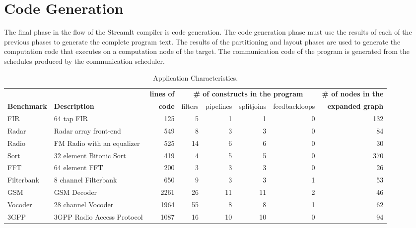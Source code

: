 \section{Code Generation}
\label{sec:codegen}

The final phase in the flow of the StreamIt compiler is code
generation.  The code generation phase must use the results of each of
the previous phases to generate the complete program text.  The
results of the partitioning and layout phases are used to generate the
computation code that executes on a computation node of the target.
The communication code of the program is generated from the schedules
produced by the communication scheduler.

\begin{table*}[t]
\begin{center}
\scriptsize
\begin{tabular}{|l|l||r||r|r|r|r||r|} \hline
 & & {\bf lines of} & \multicolumn{4}{|c||}{\bf \# of constructs in the program} & {\bf \# of nodes in the} \\ \cline{4-7}
{\bf Benchmark} & {\bf Description} & {\bf code} & filters & pipelines & splitjoins & feedbackloops & {\bf expanded graph}
\\
\hline \hline
FIR & 64 tap FIR & 
125 & 5 & 1 & 1 & 0 & 132
\\ \hline
Radar & Radar array front-end\cite{pca} & 
549 & 8 & 3 & 3 & 0 & 84
\\ \hline
Radio & FM Radio with an equalizer & 
525 & 14 & 6 & 6 & 0 & 30
\\ \hline
Sort & 32 element Bitonic Sort & 
419 & 4 & 5 & 5 & 0 & 370
\\  \hline
FFT & 64 element FFT & 
200 & 3 & 3 & 3 & 0 & 26
\\  \hline
Filterbank & 8 channel Filterbank & 
650 & 9 & 3 & 3 & 1 & 53
\\  \hline
GSM & GSM Decoder & 
2261 & 26 & 11 & 11 & 2 & 46
\\ \hline
Vocoder & 28 channel Vocoder &  
1964 & 55 & 8 & 8 & 1 & 62
\\ \hline
3GPP & 3GPP Radio Access Protocol &  
1087 & 16 & 10 & 10 & 0 & 94
\\ \hline
\hline
\end{tabular}
\vspace{-6pt}
\caption{\protect\small Application Characteristics.}
\label{tab:benchmarks}
\vspace{-12pt}
\end{center}
\end{table*}

